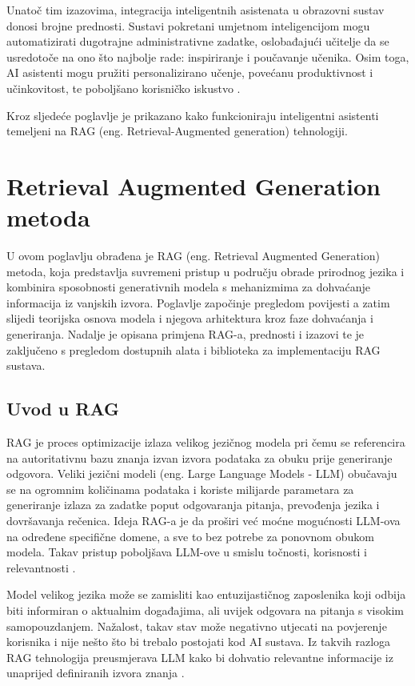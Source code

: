 \documentclass[]{foi}
\begin{document}
Unatoč tim izazovima, integracija inteligentnih asistenata u obrazovni sustav donosi brojne prednosti. Sustavi pokretani umjetnom inteligencijom mogu automatizirati dugotrajne administrativne
zadatke, oslobađajući učitelje da se usredotoče na ono što najbolje rade: inspiriranje i poučavanje učenika. Osim toga, AI asistenti mogu pružiti personalizirano učenje, povećanu produktivnost
i učinkovitost, te poboljšano korisničko iskustvo \cite{weber2025smythos}.

Kroz sljedeće poglavlje je prikazano kako funkcioniraju inteligentni asistenti temeljeni na RAG (eng. Retrieval-Augmented generation) tehnologiji.
\newpage
\chapter{Retrieval Augmented Generation metoda}

U ovom poglavlju obrađena je RAG (eng. Retrieval Augmented Generation) metoda, koja predstavlja suvremeni pristup u području obrade prirodnog jezika i kombinira sposobnosti generativnih modela
s mehanizmima za dohvaćanje informacija iz vanjskih izvora. Poglavlje započinje pregledom povijesti a zatim slijedi teorijska osnova modela i njegova arhitektura
kroz faze dohvaćanja i generiranja. Nadalje je opisana primjena RAG-a, prednosti i izazovi te je zaključeno s pregledom dostupnih alata i biblioteka za implementaciju RAG sustava.

\section{Uvod u RAG}

RAG je proces optimizacije izlaza velikog jezičnog modela pri čemu se referencira na autoritativnu bazu znanja izvan izvora podataka za obuku 
prije generiranje odgovora. Veliki jezični modeli (eng. Large Language Models - LLM) obučavaju se na ogromnim količinama podataka i koriste milijarde parametara za 
generiranje izlaza za zadatke poput odgovaranja pitanja, prevođenja jezika i dovršavanja rečenica. Ideja RAG-a je da proširi već moćne mogućnosti 
LLM-ova na određene specifične domene, a sve to bez potrebe za ponovnom obukom modela. Takav pristup poboljšava LLM-ove u smislu točnosti, 
korisnosti i relevantnosti \cite{awsRAG2025}.

Model velikog jezika može se zamisliti kao entuzijastičnog zaposlenika koji odbija biti informiran o aktualnim događajima, ali uvijek odgovara
na pitanja s visokim samopouzdanjem. Nažalost, takav stav može negativno utjecati na povjerenje korisnika i nije nešto što bi trebalo postojati
kod AI sustava. Iz takvih razloga RAG tehnologija preusmjerava LLM kako bi dohvatio relevantne informacije iz unaprijed definiranih izvora znanja \cite{awsRAG2025}.
\end{document}
